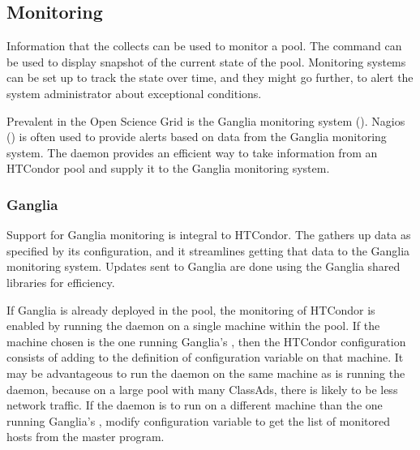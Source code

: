 \subsection{\label{sec:Monitoring}Monitoring}

Information that
the  collects can be used to monitor a pool.
The  command can be used to display
snapshot of the current state of the pool.
Monitoring systems can be set up to track the state over time,
and they might go further, 
to alert the system administrator about exceptional conditions.

Prevalent in the Open Science Grid is the Ganglia monitoring system
().
Nagios ()
is often used to provide alerts based on data from the Ganglia
monitoring system.
The  daemon provides an efficient way to take information from
an HTCondor pool and supply it to the Ganglia monitoring system.


\subsubsection{\label{sec:monitor-ganglia}Ganglia}

Support for Ganglia monitoring is integral to HTCondor.
The  gathers up data as specified by its configuration,
and it streamlines getting that data to the Ganglia monitoring
system.
Updates sent to Ganglia are done using the Ganglia shared libraries for
efficiency.

If Ganglia is already deployed in the pool,
the monitoring of HTCondor is enabled by running the  daemon
on a single machine within the pool.
If the machine chosen is the one running Ganglia's ,
then the HTCondor configuration consists of
adding  to the definition of configuration
variable  on that machine.
It may be advantageous to run the  daemon
on the same machine as is running the  daemon,
because on a large pool with many ClassAds,
there is likely to be less network traffic.
If the  daemon is to run on a different machine
than the one running Ganglia's ,
modify configuration variable  to get the
list of monitored hosts from the master  program.

